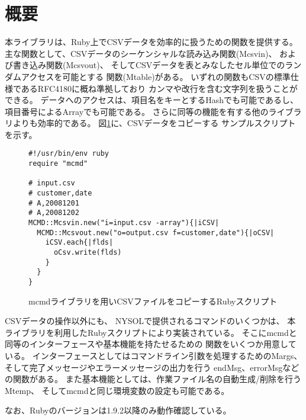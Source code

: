 
\section{概要}
本ライブラリは、Ruby上でCSVデータを効率的に扱うための関数を提供する。
主な関数として、CSVデータのシーケンシャルな読み込み関数(Mcsvin)、
および書き込み関数(Mcsvout)、
そしてCSVデータを表とみなしたセル単位でのランダムアクセスを可能とする
関数(Mtable)がある。
いずれの関数もCSVの標準仕様であるRFC4180に概ね準拠しており
カンマや改行を含む文字列を扱うことができる。
データへのアクセスは、項目名をキーとするHashでも可能であるし、
項目番号によるArrayでも可能である。
さらに同等の機能を有する他のライブラリよりも効率的である。
図\ref{fig:mcmdRB_cp}に、CSVデータをコピーする
サンプルスクリプトを示す。

\begin{figure}[!hbt]
\begin{center}

\begin{Verbatim}[baselinestretch=0.7,frame=single]
#!/usr/bin/env ruby
require "mcmd"

# input.csv
# customer,date
# A,20081201
# A,20081202
MCMD::Mcsvin.new("i=input.csv -array"){|iCSV|
  MCMD::Mcsvout.new("o=output.csv f=customer,date"){|oCSV|
    iCSV.each{|flds|
      oCsv.write(flds)
    }
  }
}
\end{Verbatim}
\end{center}
\caption{mcmdライブラリを用いCSVファイルをコピーするRubyスクリプト\label{fig:mcmdRB_cp}}
\end{figure}

CSVデータの操作以外にも、
NYSOLで提供されるコマンドのいくつかは、
本ライブラリを利用したRubyスクリプトにより実装されている。
そこにmcmdと同等のインターフェースや基本機能を持たせるための
関数をいくつか用意している。
インターフェースとしてはコマンドライン引数を処理するためのMargs、
そして完了メッセージやエラーメッセージの出力を行う
endMsg、errorMsgなどの関数がある。
また基本機能としては、作業ファイル名の自動生成/削除を行うMtemp、
そしてmcmdと同じ環境変数の設定も可能である。

なお、Rubyのバージョンは1.9.2以降のみ動作確認している。

